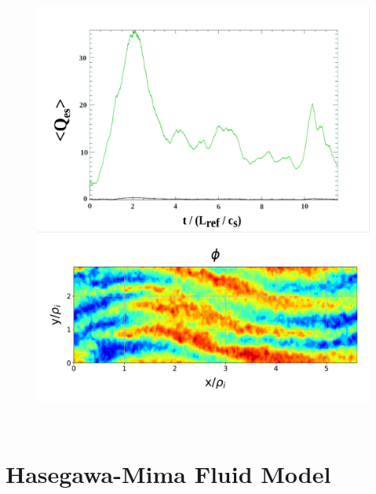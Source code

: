 \documentclass[aspectratio=43]{beamer}
\begin{document}
   \begin{frame}
      \begin{columns}
         \begin{figure}
            \hspace*{-.3cm}\includegraphics[scale=.2]{Images/etgHeatFlux.pdf}
            \hspace*{-.3cm}\includegraphics[scale=.2]{Images/genePhiETG_sat2.pdf}
         \end{figure}
      \end{columns}
   \end{frame}

   \section{Hasegawa-Mima Fluid Model}
\end{document}
